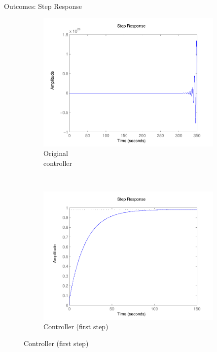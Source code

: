\documentclass{beamer}
\begin{document}
\begin{frame}[fragile]{Outcomes: Step Response}
\begin{figure}
    \centering
    \begin{subfigure}[b]{0.3\textwidth}
        \includegraphics[width=\textwidth]{figures/runningexample_step0.pdf}
        \caption{Original\\ controller}
        \label{fig:step0}
    \end{subfigure}
    ~
    \begin{subfigure}[b]{0.3\textwidth}
        \includegraphics[width=\textwidth]{figures/runningexample_step1.pdf}
        \caption{Controller (first step)}
        \label{fig:step1}
    \end{subfigure}

\end{figure}
\end{frame}
\end{document}
